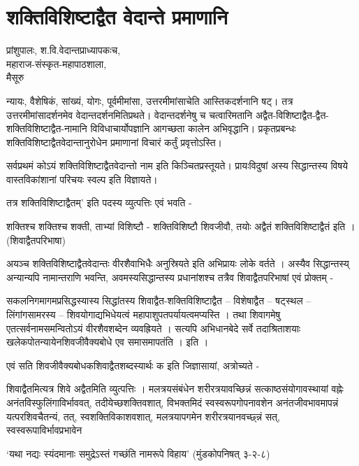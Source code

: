 \chapter{शक्तिविशिष्टाद्वैत वेदान्ते प्रमाणानि}

\begin{center}
\smallskip
प्रांशुपालः, श.वि.वेदान्तप्राध्यापकःच,\\
महाराज-संस्कृत-महापाठशाला,\\
मैसूरु

\end{center}
न्यायः, वैशेषिकं, सांख्यं, योगः, पूर्वमीमांसा, उत्तरमीमांसाचेति आस्तिकदर्शनानि षट्। तत्र उत्तरमीमांसादर्शनमेव वेदान्तदर्शनमितिप्रथते। वेदान्तदर्शनेषु च चत्वारिमतानि अद्वैत-विशिष्टाद्वैत-द्वैत-शक्तिविशिष्टाद्वैत-नामानि विविधाचार्योपज्ञानि आगच्छता कालेन अभिवृद्धानि। प्रकृतप्रबन्धः शक्तिविशिष्टाद्वैतवेदान्तानुरोधेन प्रमाणानां विचारं कर्तुं प्रवृत्तोऽस्ति।

सर्वप्रथमं कोऽयं शक्तिविशिष्टाद्वैतवेदान्तो नाम इति किञ्चितप्रस्तूयते। प्रायःविदुषां अस्य सिद्धान्तस्य विषये वास्तविकांशानां परिचयः स्वल्प इति विज्ञायते।

तत्र  शक्तिविशिष्टाद्वैतम्’ इति पदस्य व्युत्पत्तिः एवं भवति -

शक्तिश्च शक्तिश्च शक्ती, ताभ्यां विशिष्टौ -  शक्तिविशिष्टौ शिवजीवौ, तयोः अद्वैतं शक्तिविशिष्टाद्वैतं इति ।(शिवाद्वैतपरिभाषा)

अयञ्च शक्तिविशिष्टाद्वैतवेदान्तः वीरशैवाभिधैः अनुस्रियते इति अभिप्रायः लोके वर्तते । अस्यैव सिद्धान्तस्य् अन्यान्यपि नामान्तराणि भवन्ति, अवमस्यसिद्धान्तस्य प्रधानांशश्च तत्रैव शिवाद्वैतपरिभाषां एवं प्रोक्तम् -

सकलनिगमागमप्रसिद्धस्यास्य सिद्धांतस्य शिवाद्वैत-शक्तिविशिष्टाद्वैत – विशेषाद्वैत – षट्स्थल – लिंगांगसामरस्य – शिवयोगाद्यभिधेयत्वं महापाशुपतपर्यायत्वमप्यस्ति । तथा शिवागमेषु एतत्सर्वनामसमन्वितोऽयं वीरशैवशब्देन व्यवह्रियते । सत्यपि अभिधानबेदे सर्वे तदाश्रिताशयाः खलेकपोतन्यायेनशिवजीवैक्यबोधे एव समासमापतंति । इति ।

एवं सति शिवजीवैक्यबोधकशिवाद्वैतशब्दस्यार्थः क  इति जिज्ञासायां, अत्रोच्यते -

शिवाद्वैतमित्यत्र शिवे अद्वैतमिति व्युत्पत्तिः । मलत्रयसंबंधेन शरीरत्रयावच्छिन्नं सत्काष्ठसंयोगावस्थायां वह्नेः अनंतविस्फुलिंगाविर्भाववत्, तदीयेच्छशक्तिवशात्, विभक्तमिदं स्वस्वरूपगोपनावशेन अनंतजीवभावमापन्नं यत्परशिवचैतन्यं, तत्, स्वशक्तिविकाशवशात्, मलत्रयापगमेन शरीरत्रयानवच्छ्न्नं सत्,  स्वस्वरूपाविर्भावप्रभावेन

‘यथा नद्यः स्यंदमानाः समुद्रेऽस्तं गच्छंति नामरूपे विहाय’ (मुंडकोपनिषत् ३-२-८)


